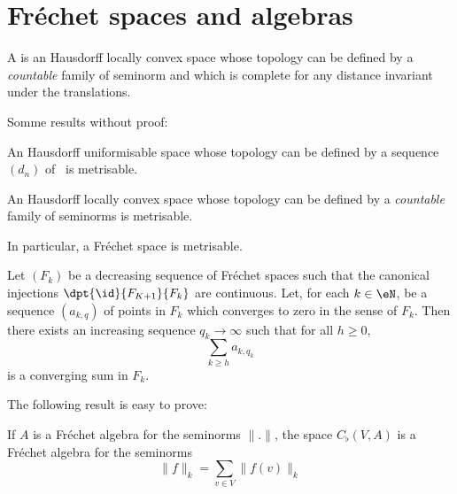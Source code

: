 
\section{Fréchet spaces and algebras}

\begin{definition}
A  is an Hausdorff locally convex space whose topology can be defined by a \emph{countable} family of seminorm and which is complete for any distance invariant under the translations.
\end{definition}

Somme results without proof:
\begin{lemma}
 An Hausdorff uniformisable space whose topology can be defined by a sequence $(d_n)$ of \ecarts\ is metrisable.
\end{lemma}

\begin{lemma}
An Hausdorff locally convex space whose topology can be defined by a \emph{countable} family of seminorms is metrisable.
\end{lemma}

In particular, a Fréchet space is metrisable.

\begin{lemma} \label{prop_suiteFk}
Let $(F_k)$ be a decreasing sequence of Fréchet spaces such that the canonical injections $\dpt{\id}{F_{K+1}}{F_k}$ are continuous. Let, for each $k\in\eN$, be a sequence $(a_{k,q})$ of points in $F_k$ which converges to zero in the sense of $F_k$. Then there exists an increasing sequence $q_k\to\infty$ such that for all $h\geq 0$, 
\[ 
  \sum_{k\geq h}a_{k,q_k}
\]
is a converging sum in $F_k$.
\end{lemma}

The following result is easy to prove:

\begin{proposition}
If $A$ is a Fréchet algebra for the seminorms $\| . \|$, the space $C_{\flat}(V,A)$ is a Fréchet algebra for the seminorms 
\[ 
  \| f \|_k=\sum_{v\in V}\| f(v) \|_k
\]
\end{proposition}


